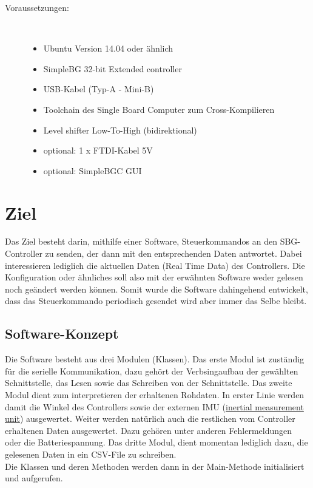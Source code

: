 \documentclass[12pt]{article} %
\begin{document}
	\begin{description}
		\item[Voraussetzungen:]~\par
		\begin{itemize}
			\item Ubuntu Version 14.04 oder ähnlich
			\item SimpleBG 32-bit Extended controller
			\item USB-Kabel (Typ-A - Mini-B)
			\item Toolchain des Single Board Computer zum Cross-Kompilieren
			\item Level shifter Low-To-High (bidirektional)
			\item optional: 1 x FTDI-Kabel 5V
			\item optional: SimpleBGC GUI	
		\end{itemize}
	\end{description}
	

	\section{Ziel}
	Das Ziel besteht darin, mithilfe einer Software, Steuerkommandos an den SBG-Controller zu senden, der dann mit den entsprechenden Daten antwortet. Dabei interessieren lediglich die aktuellen Daten (Real Time Data) des Controllers. Die Konfiguration oder ähnliches soll also mit der erwähnten Software weder gelesen noch geändert werden können. Somit wurde die Software dahingehend entwickelt, dass das Steuerkommando periodisch gesendet wird aber immer das Selbe bleibt.
	
	\subsection{Software-Konzept}
	Die Software besteht aus drei Modulen (Klassen). Das erste Modul ist zuständig für die serielle Kommunikation, dazu gehört der Verbsingaufbau der gewählten Schnittstelle, das Lesen sowie das Schreiben von der Schnittstelle.
	Das zweite Modul dient zum interpretieren der erhaltenen Rohdaten. In erster Linie werden damit die Winkel des Controllers sowie der externen IMU (\href{https://de.wikipedia.org/wiki/Inertiale_Messeinheit}{inertial measurement unit}) ausgewertet. Weiter werden natürlich auch die restlichen vom Controller erhaltenen Daten ausgewertet. Dazu gehören unter anderen Fehlermeldungen oder die Batteriespannung.
	Das dritte Modul, dient momentan lediglich dazu, die gelesenen Daten in ein CSV-File zu schreiben.\\
	Die Klassen und deren Methoden werden dann in der Main-Methode initialisiert und aufgerufen.
	
\end{document}
